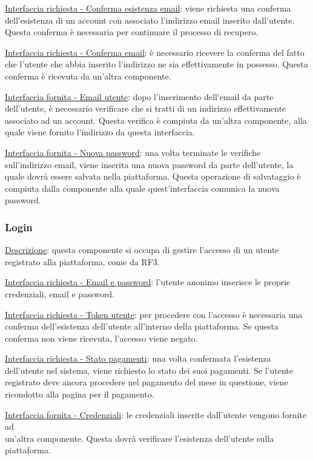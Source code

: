 \documentclass[a4paper,12pt]{article}
\begin{document}
\underline{Interfaccia richiesta - Conferma esistenza email}: viene richiesta una conferma dell’esistenza di un account con associato l’indirizzo email inserito dall’utente. Questa conferma è necessaria per continuare il processo di recupero.

\underline{Interfaccia richiesta - Conferma email}: è necessario ricevere la conferma del fatto che l’utente che abbia inserito l’indirizzo ne sia effettivamente in possesso. Questa conferma è ricevuta da un’altra componente.

\underline{Interfaccia fornita - Email utente}: dopo l’inserimento dell’email da parte dell’utente, è necessario verificare che si tratti di un indirizzo effettivamente associato ad un account. Questa verifica è compiuta da un’altra componente, alla quale viene fornito l’indirizzo da questa interfaccia.

\underline{Interfaccia fornita - Nuova password}: una volta terminate le verifiche sull’indirizzo email, viene inserita una nuova password da parte dell’utente, la quale dovrà essere salvata nella piattaforma. Questa operazione di salvataggio è compiuta dalla componente alla quale quest’interfaccia comunica la nuova password.

\subsubsection{Login}

\underline{Descrizione}: questa componente si occupa di gestire l’accesso di un utente registrato alla piattaforma, come da RF3.

\underline{Interfaccia richiesta - Email e password}: l’utente anonimo inserisce le proprie credenziali, email e password.

\underline{Interfaccia richiesta - Token utente}: per procedere con l’accesso è necessaria una conferma dell’esistenza dell’utente all’interno della piattaforma. Se questa conferma non viene ricevuta, l’accesso viene negato.

\underline{Interfaccia richiesta - Stato pagamenti}: una volta confermata l’esistenza dell’utente nel sistema, viene richiesto lo stato dei suoi pagamenti. Se l’utente registrato deve ancora procedere nel pagamento del mese in questione, viene ricondotto alla pagina per il pagamento.

\underline{Interfaccia fornita - Credenziali}: le credenziali inserite dall’utente vengono fornite ad \\ un’altra componente. Questa dovrà verificare l’esistenza dell’utente sulla piattaforma.
\end{document}
